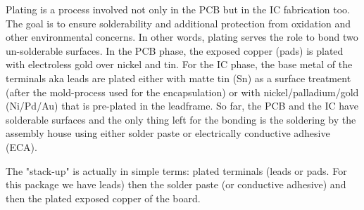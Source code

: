 \documentclass[final]{cubedoc}
\begin{document}
	
	
	
	
	
	Plating is a process involved not only in the PCB but in the IC fabrication too. The goal is to ensure solderability and additional protection from oxidation and other environmental concerns. In other words, plating serves the role to bond two un-solderable surfaces. In the PCB phase, the exposed copper (pads) is plated with electroless gold over nickel and tin. For the IC phase, the base metal of the terminals aka leads are plated either with matte tin (Sn) as a surface treatment (after the mold-process used for the encapsulation) or with  nickel/palladium/gold (Ni/Pd/Au) that is pre-plated in the leadframe. So far, the PCB and the IC have solderable surfaces and the only thing left for the bonding is the soldering by the assembly house using either solder paste or electrically conductive adhesive (ECA).  
	
	
	
	
	The "stack-up" is actually in simple terms: plated terminals (leads or pads. For this package we have leads) then the solder paste (or conductive adhesive) and then the plated exposed copper of the board. 
	
\end{document}
